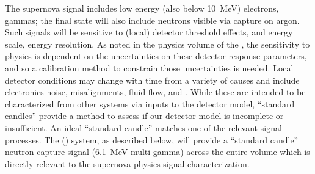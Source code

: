 

The supernova signal includes low energy (also below \SI{10}{\MeV}) electrons, gammas; the final state will also include neutrons visible via capture on argon. Such signals will be sensitive to (local) detector threshold effects, and energy scale, energy resolution. 
As noted in the physics volume of the , 
the sensitivity to  physics 
is dependent on the uncertainties on these detector response parameters, and so a calibration method to constrain those uncertainties is needed.
Local detector conditions may change with time from a variety of 
causes and include electronics noise, misalignments, fluid flow, and \efield. While these are intended to be characterized from other systems via inputs to the detector model, ``standard candles'' provide a method to assess if our detector model is incomplete or insufficient. An ideal ``standard candle'' matches one of the relevant signal processes. The  () system, as described below, will provide a ``standard candle'' neutron capture signal (\SI{6.1}{\MeV} multi-gamma) across the entire  volume which is directly relevant to the supernova physics signal characterization.



